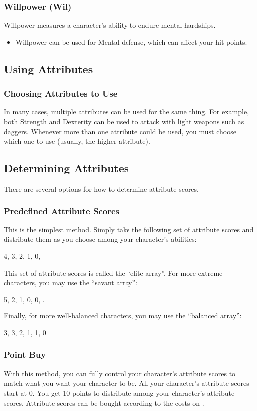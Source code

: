 \subsubsection{Willpower (Wil)}
Willpower measures a character's ability to endure mental hardships.
\begin{itemize}
    \item Willpower can be used for Mental defense, which can affect your hit points.
\end{itemize}

\subsection{Using Attributes}

\subsubsection{Choosing Attributes to Use}
In many cases, multiple attributes can be used for the same thing. For example, both Strength and Dexterity can be used to attack with light weapons such as daggers. Whenever more than one attribute could be used, you must choose which one to use (usually, the higher attribute).

\subsection{Determining Attributes}
There are several options for how to determine attribute scores.

\subsubsection{Predefined Attribute Scores}
This is the simplest method. Simply take the following set of attribute scores and distribute them as you choose among your character's abilities:

4, 3, 2, 1, 0, 

This set of attribute scores is called the ``elite array''. For more extreme characters, you may use the ``savant array'':

5, 2, 1, 0, 0, .

Finally, for more well-balanced characters, you may use the ``balanced array'':

3, 3, 2, 1, 1, 0

\subsubsection{Point Buy}
With this method, you can fully control your character's attribute scores to match what you want your character to be. All your character's attribute scores start at 0. You get 10 points to distribute among your character's attribute scores. Attribute scores can be bought according to the costs on .


